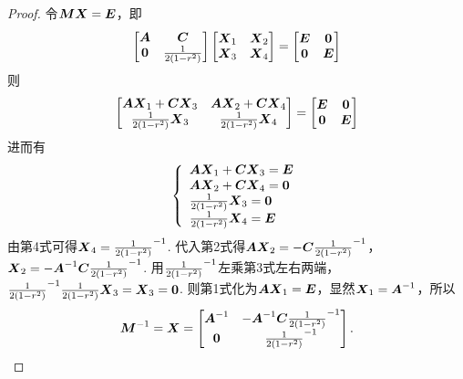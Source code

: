 \begin{example}
\begin{proof}
令\(\mat{M}\x=\E\)，即\[
\begin{bmatrix}
\A & \C \\
\z & \B
\end{bmatrix}\begin{bmatrix}
\x_1 & \x_2 \\
\x_3 & \x_4
\end{bmatrix} = \begin{bmatrix}
\E & \z \\
\z & \E
\end{bmatrix}
\]则\[
\begin{bmatrix}
\A\x_1+\C\x_3 & \A\x_2+\C\x_4 \\
\B\x_3 & \B\x_4
\end{bmatrix} = \begin{bmatrix}
\E & \z \\
\z & \E
\end{bmatrix}
\]进而有\[
\left\{ \begin{array}{l}
\A\x_1+\C\x_3 = \E \\
\A\x_2+\C\x_4 = \z \\
\B\x_3 = \z \\
\B\x_4 = \E
\end{array} \right.
\]
由第4式可得\(\x_4 = \B^{-1}\).
代入第2式得\(\A\x_2=-\C\B^{-1}\)，%
\(\x_2=-\A^{-1}\C\B^{-1}\).
用\(\B^{-1}\)左乘第3式左右两端，\(\B^{-1}\B\x_3=\x_3=\z\).
则第1式化为\(\A\x_1=\E\)，显然\(\x_1=\A^{-1}\)，所以\[
\mat{M}^{-1} = \x = \begin{bmatrix}
\A^{-1} & -\A^{-1}\C\B^{-1} \\
\z & \B^{-1}
\end{bmatrix}.
\qedhere
\]
\end{proof}
\end{example}

